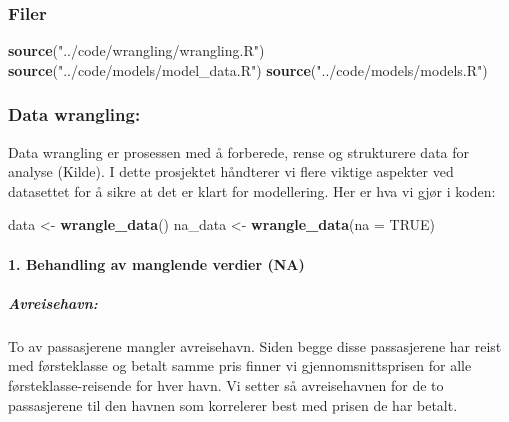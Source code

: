 \documentclass[
]{article}
\newenvironment{Shaded}{\begin{snugshade}}{\end{snugshade}}
\newcommand{\AttributeTok}[1]{\textcolor[rgb]{0.13,0.29,0.53}{#1}}
\newcommand{\ConstantTok}[1]{\textcolor[rgb]{0.56,0.35,0.01}{#1}}
\newcommand{\FunctionTok}[1]{\textcolor[rgb]{0.13,0.29,0.53}{\textbf{#1}}}
\newcommand{\NormalTok}[1]{#1}
\newcommand{\OtherTok}[1]{\textcolor[rgb]{0.56,0.35,0.01}{#1}}
\newcommand{\StringTok}[1]{\textcolor[rgb]{0.31,0.60,0.02}{#1}}
\begin{document}
\subsubsection{Filer}\label{filer}

\begin{Shaded}
\begin{Highlighting}[]
\FunctionTok{source}\NormalTok{(}\StringTok{"../code/wrangling/wrangling.R"}\NormalTok{)}
\FunctionTok{source}\NormalTok{(}\StringTok{"../code/models/model\_data.R"}\NormalTok{)}
\FunctionTok{source}\NormalTok{(}\StringTok{"../code/models/models.R"}\NormalTok{)}
\end{Highlighting}
\end{Shaded}

\subsubsection{Data wrangling:}\label{data-wrangling}

Data wrangling er prosessen med å forberede, rense og strukturere data
for analyse (Kilde). I dette prosjektet håndterer vi flere viktige
aspekter ved datasettet for å sikre at det er klart for modellering. Her
er hva vi gjør i koden:

\begin{Shaded}
\begin{Highlighting}[]
\NormalTok{  data }\OtherTok{\textless{}{-}} \FunctionTok{wrangle\_data}\NormalTok{()}
\NormalTok{  na\_data }\OtherTok{\textless{}{-}} \FunctionTok{wrangle\_data}\NormalTok{(}\AttributeTok{na =} \ConstantTok{TRUE}\NormalTok{)}
\end{Highlighting}
\end{Shaded}

\paragraph{1. Behandling av manglende verdier
(NA)}\label{behandling-av-manglende-verdier-na}

\subparagraph{Avreisehavn:}\label{avreisehavn}

To av passasjerene mangler avreisehavn. Siden begge disse passasjerene
har reist med førsteklasse og betalt samme pris finner vi
gjennomsnittsprisen for alle førsteklasse-reisende for hver havn. Vi
setter så avreisehavnen for de to passasjerene til den havnen som
korrelerer best med prisen de har betalt.
\end{document}
